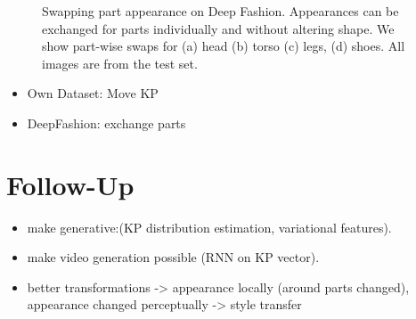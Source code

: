 \begin{figure}[t]
\begin{subfigure}{0.24\linewidth}
		\label{fig:part3_30}
		\end{subfigure}
		\caption{Swapping part appearance on Deep Fashion. Appearances can be exchanged for parts individually and without altering shape. We show part-wise swaps for (a) head (b) torso (c) legs, (d) shoes. All images are from the test set.}
		\label{fig:partswaps}
	\end{figure}
	\begin{itemize}
		\item Own Dataset: Move KP
		\item DeepFashion: exchange parts
	\end{itemize}

\section{Follow-Up}
	\begin{itemize}
		\item make generative:(KP distribution estimation, variational features).
		\item make video generation possible (RNN on KP vector).
		\item better transformations -> appearance locally (around parts changed), appearance changed perceptually -> style transfer
	\end{itemize}





